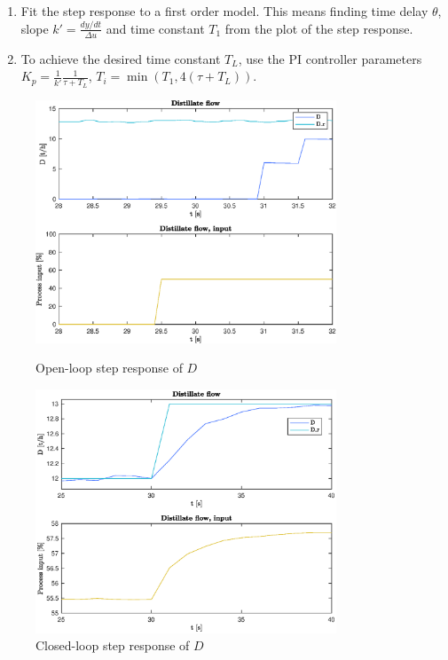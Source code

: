 \documentclass[12pt]{article}
\begin{document}
\begin{enumerate}
\item Fit the step response to a first order model. This means finding time delay $\theta$, slope $k' = \frac{dy/dt}{\Delta u}$ and time constant $T_1$ from the plot of the step response.
\item To achieve the desired time constant $T_L$, use the PI controller parameters $K_p = \frac{1}{k'} \frac{1}{\tau + T_L}$, $T_i = \min(T_1, 4(\tau + T_L))$.
\end{enumerate}

\begin{figure}[p]
\centering
\includegraphics[width=0.8\textwidth]{../Systemanalyse/Log_Data_to_Matlab/Figurer/Stegeksperimenter/FC1005.eps}
\caption{Open-loop step response of $D$}
\label{fig:ol_step_FC1005}

\includegraphics[width=0.8\textwidth]{../Systemanalyse/Log_Data_to_Matlab/Figurer/Stegeksperimenter/FC1005_step.eps}
\caption{Closed-loop step response of $D$}
\label{fig:cl_step_FC1005}
\end{figure}
\end{document}
